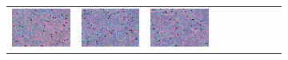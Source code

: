 \documentclass{ipol}
\begin{document}
\begin{figure}[ht]
\begin{subfigure}[t]{\linewidth}
\begin{tabular}{ccccccccc}
                \includegraphics[width=\s]{images/night/DHT/bid_j95_64_grids.png}&
                \includegraphics[width=\s]{images/night/LINEAR/bid_j95_64_grids.png}&
                \includegraphics[width=\s]{images/night/PPG/bid_j95_64_grids.png}&

\end{tabular}
\end{subfigure}
\end{figure}
\end{document}
